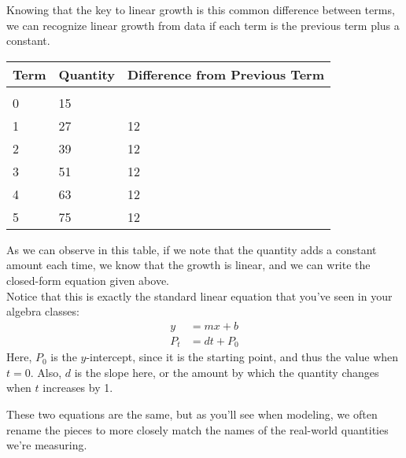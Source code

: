 Knowing that the key to linear growth is this common difference between terms, we can recognize linear growth from data if each term is the previous term plus a constant.
\begin{center}
\begin{tabular}{p{0.5in} p{0.75in} p{1.25in}}
\textbf{Term} & \textbf{Quantity} & \textbf{Difference from Previous Term}\\
\hline
& & \\
0 & 15 & \\
1 & 27 & 12\\
2 & 39 & 12\\
3 & 51 & 12\\
4 & 63 & 12\\
5 & 75 & 12\\
\end{tabular}
\end{center}
As we can observe in this table, if we note that the quantity adds a constant amount each time, we know that the growth is linear, and we can write the closed-form equation given above.\\

Notice that this is exactly the standard linear equation that you've seen in your algebra classes:
\begin{align*}
y &= mx+b\\
P_t &= dt + P_0
\end{align*}
Here, $P_0$ is the $y$-intercept, since it is the starting point, and thus the value when $t=0$.  Also, $d$ is the slope here, or the amount by which the quantity changes when $t$ increases by 1.

These two equations are the same, but as you'll see when modeling, we often rename the pieces to more closely match the names of the real-world quantities we're measuring.

